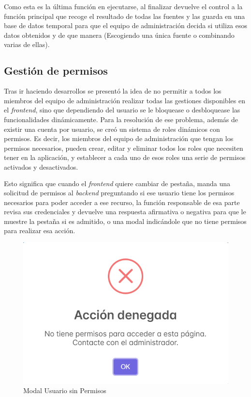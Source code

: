 Como esta es la última función en ejecutarse, al finalizar devuelve el control a la función principal que recoge el resultado de todas las fuentes y las guarda en una base de datos temporal para que el equipo de administración decida si utiliza esos datos obtenidos y de que manera (Escogiendo una única fuente o combinando varias de ellas).


\subsection{Gestión de permisos}
Tras ir haciendo desarrollos se presentó la idea de no permitir a todos los miembros del equipo de administración realizar todas las gestiones disponibles en el \textit{frontend}, sino que dependiendo del usuario se le bloquease o desbloquease las funcionalidades dinámicamente. Para la resolución de ese problema, además de existir una cuenta por usuario, se creó un sistema de roles dinámicos con permisos. Es decir, los miembros del equipo de administración que tengan los permisos necesarios, pueden crear, editar y eliminar todos los roles que necesiten tener en la aplicación, y establecer a cada uno de esos roles una serie de permisos activados y desactivados.

Esto significa que cuando el \textit{frontend} quiere cambiar de pestaña, manda una solicitud de permisos al \textit{backend} preguntando si ese usuario tiene los permisos necesarios para poder acceder a ese recurso, la función responsable de esa parte revisa sus credenciales y devuelve una respuesta afirmativa o negativa para que le muestre la pestaña si es admitido, o una modal indicándole que no tiene permisos para realizar esa acción.

\begin{figure}[h]
    \centering
    \includegraphics[width=0.75\linewidth]{Imagenes/Modal sin permiso.png}
    \caption{Modal Usuario sin Permisos}
    \label{Modal Usuario sin Permisos}
\end{figure}
\FloatBarrier


